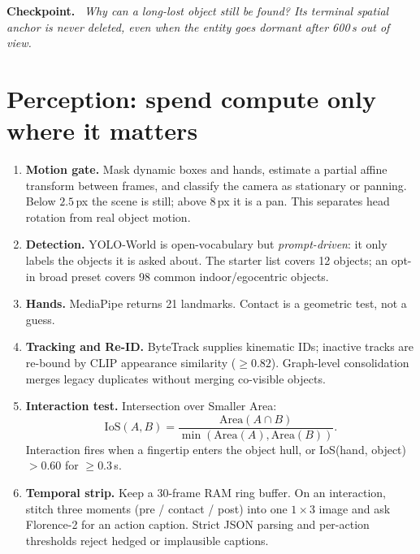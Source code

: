 \documentclass[10pt,a4paper]{article}
\newenvironment{checkpoint}
  {\par\medskip\noindent\colorbox{accent!5}\bgroup
     \begin{minipage}{\dimexpr\linewidth-2\fboxsep\relax}
     \vspace{3pt}\textbf{\textcolor{accent}{Checkpoint.}}\ \itshape}
  {\vspace{3pt}\end{minipage}\egroup\par\medskip}
\begin{document}
\begin{checkpoint}
Why can a long-lost object still be found? \emph{Its terminal spatial anchor is never deleted, even
when the entity goes dormant after 600\,s out of view.}
\end{checkpoint}

\section{Perception: spend compute only where it matters}

\begin{enumerate}[leftmargin=1.25em,itemsep=1pt]
  \item \textbf{Motion gate.} Mask dynamic boxes and hands, estimate a partial affine transform
        between frames, and classify the camera as stationary or panning. Below \(2.5\)\,px the
        scene is still; above \(8\)\,px it is a pan. This separates head rotation from real object
        motion.
  \item \textbf{Detection.} YOLO-World is open-vocabulary but \emph{prompt-driven}: it only labels
        the objects it is asked about. The starter list covers 12 objects; an opt-in broad preset
        covers 98 common indoor/egocentric objects.
  \item \textbf{Hands.} MediaPipe returns 21 landmarks. Contact is a geometric test, not a guess.
  \item \textbf{Tracking and Re-ID.} ByteTrack supplies kinematic IDs; inactive tracks are re-bound
        by CLIP appearance similarity (\(\geq 0.82\)). Graph-level consolidation merges legacy
        duplicates without merging co-visible objects.
  \item \textbf{Interaction test.} Intersection over Smaller Area:
        \[
          \mathrm{IoS}(A,B)=\frac{\mathrm{Area}(A\cap B)}{\min(\mathrm{Area}(A),\mathrm{Area}(B))}.
        \]
        Interaction fires when a fingertip enters the object hull, or IoS(hand, object) \(>0.60\)
        for \(\geq 0.3\)\,s.
  \item \textbf{Temporal strip.} Keep a 30-frame RAM ring buffer. On an interaction, stitch three
        moments (pre / contact / post) into one \(1\times3\) image and ask Florence-2 for an action
        caption. Strict JSON parsing and per-action thresholds reject hedged or implausible captions.
\end{enumerate}
\end{document}
